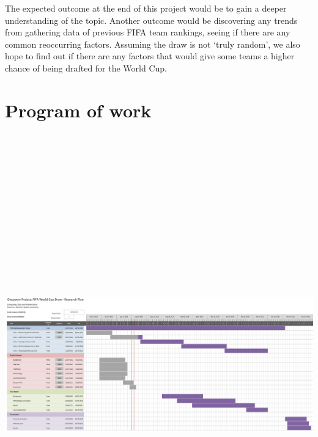 \documentclass[11pt,a4paper]{scrartcl}
\begin{document}

The expected outcome at the end of this project would be to gain a deeper understanding of the topic. Another outcome would be discovering any trends from gathering data of previous FIFA team rankings, seeing if there are any common reoccurring factors. Assuming the draw is not ‘truly random’, we also hope to find out if there are any factors that would give some teams a higher chance of being drafted for the World Cup. 

\newpage

\section{Program of work}


\includegraphics[angle=90,height=20cm,width=\linewidth]{ProposalGantt.PNG}


\newpage



\end{document}
